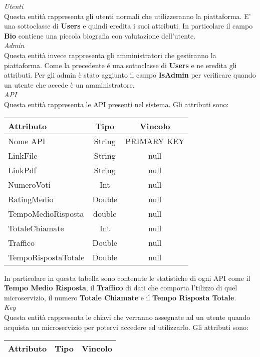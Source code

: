 {{			\textit{Utenti}\\
			Questa entità rappresenta gli utenti normali che utilizzeranno la piattaforma. E' una sottoclasse di \textbf{Users} e quindi eredita i suoi attributi. In particolare il campo \textbf{Bio} contiene una piccola biografia con valutazione dell'utente.  \\
			\textit{Admin}\\
			Questa entità invece rappresenta gli amministratori che gestiranno la piattaforma. Come la precedente é una sottoclasse di \textbf{Users} e ne eredita gli attributi. Per gli admin è stato aggiunto il campo \textbf{IsAdmin} per verificare quando un utente che accede è un amministratore. \\
			\textit{API}\\
			Questa entità rappresenta le API presenti nel sistema. Gli attributi sono:
			\begin{center}
			\begin{tabular}{lcc}
				\hline
				\textbf{Attributo}&\textbf{Tipo}&\textbf{Vincolo}\\ \hline
				Nome API&String&PRIMARY KEY\\
				LinkFile&String&null\\
				LinkPdf&String&null \\
				NumeroVoti&Int&null \\
				RatingMedio&Double&null \\
				TempoMedioRisposta&double&null \\
				TotaleChiamate&Int&null \\
				Traffico&Double&null \\
				TempoRispostaTotale&Double&null \\
			\end{tabular}
			\end{center}
			In particolare in questa tabella sono contenute le statistiche di ogni API come il \textbf{Tempo Medio Risposta}, il \textbf{Traffico} di dati che comporta l'tilizzo di quel microservizio, il numero \textbf{Totale Chiamate} e il \textbf{Tempo Risposta Totale}. \\
			\textit{Key}\\
			Questa entità rappresenta le chiavi che verranno assegnate ad un utente quando acquista un microservizio per potervi accedere ed utilizzarlo. Gli attributi sono: \\
			\begin{center}
			\begin{tabular}{lcc}
				\textbf{Attributo}&\textbf{Tipo}&\textbf{Vincolo}\\ \hline

\end{tabular}
\end{center}}}
